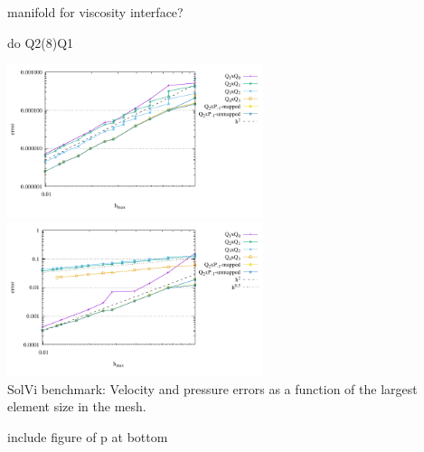 manifold for viscosity interface?

do Q2(8)Q1


\begin{center}
\includegraphics[width=7.5cm]{python_codes/fieldstone_117/results/errorsV}
\includegraphics[width=7.5cm]{python_codes/fieldstone_117/results/errorsP}\\
{\captionfont SolVi benchmark: Velocity and pressure errors as a function of the largest element size in the mesh.}
\end{center}

include figure of p at bottom
